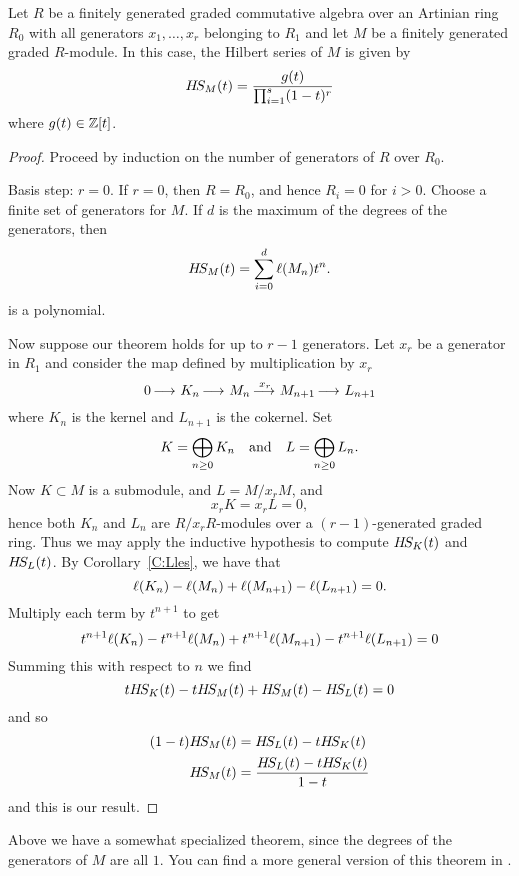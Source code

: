 \documentclass{ximera}
\begin{document}
\begin{theorem}
  Let $R$ be a finitely generated graded commutative algebra over an
  Artinian ring $R_0$ with all generators $x_1,\dots,x_r$ belonging to
  $R_1$ and let $M$ be a finitely generated graded $R$-module. In this
  case, the Hilbert series of $M$ is given by
  \[
  H\!S_M(t) = \frac{g(t)}{\prod_{i=1}^s(1-t)^r}
  \]
  where $g(t)\in\mathbb Z[t]$.
  \begin{proof}
    Proceed by induction on the number of generators of $R$ over
    $R_0$.

    Basis step: $r =0$. If $r=0$, then $R=R_0$, and hence $R_i = 0$
    for $i>0$. Choose a finite set of generators for $M$. If $d$ is
    the maximum of the degrees of the generators, then 
    \[
    H\!S_M(t) = \sum_{i=0}^d \ell(M_n) t^n.
    \]
    is a polynomial.

    Now suppose our theorem holds for up to $r-1$ generators. Let
    $x_r$ be a generator in $R_1$ and consider the map defined by
    multiplication by $x_r$
    \[
    0\mathop{\longrightarrow\,}\limits K_n \mathop{\longrightarrow\,}\limits M_n \mathop{\longrightarrow\,}\limits^{x_r} M_{n+1} \mathop{\longrightarrow\,}\limits L_{n+1}
    \]
    where $K_n$ is the kernel and $L_{n+1}$ is the cokernel. Set
    \[
    K = \bigoplus_{n\ge 0} K_n\quad\text{and}\quad L = \bigoplus_{n\ge 0} L_n.
    \]
    Now $K\subset M$ is a submodule, and $L = M/x_r M$, and
    \[
    x_r K = x_r L = 0,
    \]
    hence both $K_n$ and $L_n$ are $R/x_r R$-modules over a
    $(r-1)$-generated graded ring. Thus we may apply the inductive
    hypothesis to compute $H\!S_K(t)$ and $H\!S_L(t)$. By
    Corollary~\ref{C:Lles}, we have that
    \[
    \ell(K_n)-\ell(M_n) + \ell(M_{n+1}) -\ell(L_{n+1}) = 0.
    \]
    Multiply each term by $t^{n+1}$ to get
    \[
    t^{n+1}\ell(K_n)-t^{n+1}\ell(M_n) + t^{n+1}\ell(M_{n+1}) -t^{n+1}\ell(L_{n+1}) = 0
    \]
    Summing this with respect to $n$ we find
    \[
    tH\!S_K(t) - tH\!S_M(t)  + H\!S_M(t) - H\!S_L(t) = 0
    \]
    and so
    \begin{align*}
      (1-t)H\!S_M(t) &= H\!S_L(t) - tH\!S_K(t)\\
      H\!S_M(t) &= \frac{H\!S_L(t) - tH\!S_K(t)}{1-t}
    \end{align*}
    and this is our result.
  \end{proof}
\end{theorem}

\begin{remark}
  Above we have a somewhat specialized theorem, since the degrees of
  the generators of $M$ are all $1$. You can find a more general
  version of this theorem in \cite{AM1969,hM1986}.
\end{remark}
\end{document}
